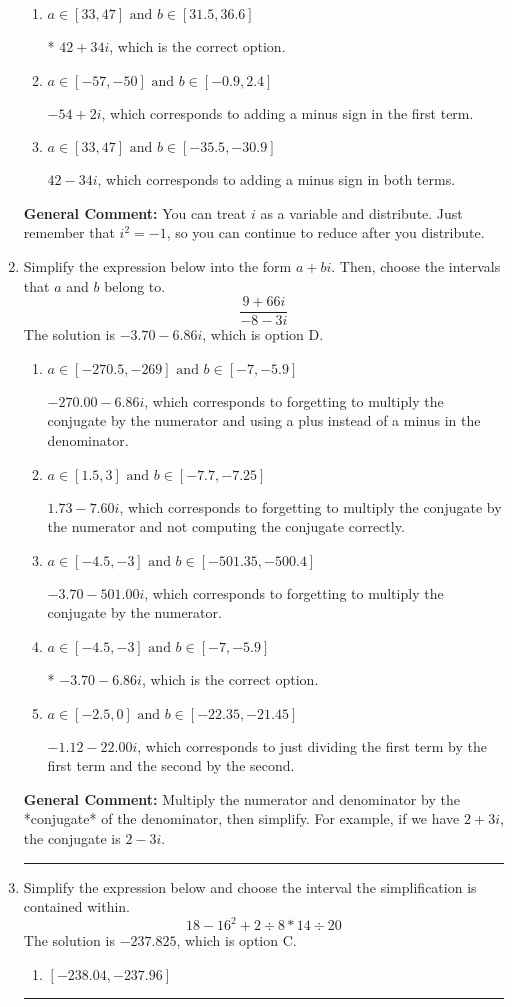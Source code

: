 \documentclass{extbook}[14pt]
\newcommand{\litem}[1]{\item #1

\rule{\textwidth}{0.4pt}}
\begin{document}
\begin{enumerate}
{\begin{enumerate}[label=\Alph*.]
 $-54 - 2 i$, which corresponds to adding a minus sign in the second term.
\item \( a \in [33, 47] \text{ and } b \in [31.5, 36.6] \)

* $42 + 34 i$, which is the correct option.
\item \( a \in [-57, -50] \text{ and } b \in [-0.9, 2.4] \)

 $-54 + 2 i$, which corresponds to adding a minus sign in the first term.
\item \( a \in [33, 47] \text{ and } b \in [-35.5, -30.9] \)

 $42 - 34 i$, which corresponds to adding a minus sign in both terms.
\end{enumerate}

\textbf{General Comment:} You can treat $i$ as a variable and distribute. Just remember that $i^2=-1$, so you can continue to reduce after you distribute.
}
\litem{
Simplify the expression below into the form $a+bi$. Then, choose the intervals that $a$ and $b$ belong to.
\[ \frac{9 + 66 i}{-8 - 3 i} \]The solution is \( -3.70  - 6.86 i \), which is option D.\begin{enumerate}[label=\Alph*.]
\item \( a \in [-270.5, -269] \text{ and } b \in [-7, -5.9] \)

 $-270.00  - 6.86 i$, which corresponds to forgetting to multiply the conjugate by the numerator and using a plus instead of a minus in the denominator.
\item \( a \in [1.5, 3] \text{ and } b \in [-7.7, -7.25] \)

 $1.73  - 7.60 i$, which corresponds to forgetting to multiply the conjugate by the numerator and not computing the conjugate correctly.
\item \( a \in [-4.5, -3] \text{ and } b \in [-501.35, -500.4] \)

 $-3.70  - 501.00 i$, which corresponds to forgetting to multiply the conjugate by the numerator.
\item \( a \in [-4.5, -3] \text{ and } b \in [-7, -5.9] \)

* $-3.70  - 6.86 i$, which is the correct option.
\item \( a \in [-2.5, 0] \text{ and } b \in [-22.35, -21.45] \)

 $-1.12  - 22.00 i$, which corresponds to just dividing the first term by the first term and the second by the second.
\end{enumerate}

\textbf{General Comment:} Multiply the numerator and denominator by the *conjugate* of the denominator, then simplify. For example, if we have $2+3i$, the conjugate is $2-3i$.
}
\litem{
Simplify the expression below and choose the interval the simplification is contained within.
\[ 18 - 16^2 + 2 \div 8 * 14 \div 20 \]The solution is \( -237.825 \), which is option C.\begin{enumerate}[label=\Alph*.]
\item \( [-238.04, -237.96] \)


\end{enumerate}}
\end{enumerate}
\end{document}
